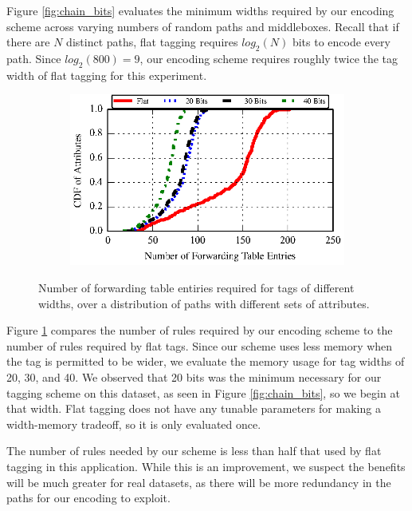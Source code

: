 Figure \ref{fig:chain_bits} evaluates the minimum widths required by our encoding scheme across varying numbers of random paths and middleboxes. Recall that if there are $N$ distinct paths, flat tagging requires $log_2(N)$ bits to encode every path. Since $log_2(800) = 9$, our encoding scheme requires roughly twice the tag width of flat tagging for this experiment. 

\begin{figure}[t!] 
\begin{minipage}{1\linewidth}
\begin{subfigure}[b]{0.96\linewidth}
\includegraphics[width=\linewidth]{figures/attr_cdf}
\end{subfigure} 
\end{minipage} 
\caption{Number of forwarding table entiries required for tags of
  different widths, over a distribution of paths with different sets of
  attributes.}
\label{fig:chain_rules}
\end{figure}

Figure \ref{fig:chain_rules} compares the number of rules required by
our encoding scheme to the number of rules required by flat tags. Since
our scheme uses less memory when the tag is permitted to be wider, we
evaluate the memory usage for tag widths of 20, 30, and 40. We observed
that 20 bits was the minimum necessary for our tagging scheme on this
dataset, as seen in Figure \ref{fig:chain_bits}, so we begin at that
width. Flat tagging does not have any tunable parameters for making a
width-memory tradeoff, so it is only evaluated once. 

The number of rules needed by our scheme is less than half that used by flat tagging in this application. While this is an improvement, we suspect the benefits will be much greater for real datasets, as there will be more redundancy in the paths for our encoding to exploit.
